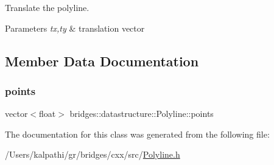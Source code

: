Translate the polyline. 


\begin{DoxyParams}{Parameters}
{\em tx,ty} & translation vector \\
\hline
\end{DoxyParams}


\subsection{Member Data Documentation}
\mbox{\label{classbridges_1_1datastructure_1_1_polyline_a0df21b6c3cc82930a93a495de5affda7}} 
\subsubsection{\texorpdfstring{points}{points}}
{\footnotesize\ttfamily vector$<$float$>$ bridges\+::datastructure\+::\+Polyline\+::points\hspace{0.3cm}{\ttfamily [protected]}}



The documentation for this class was generated from the following file\+:\begin{DoxyCompactItemize}
\item 
/\+Users/kalpathi/gr/bridges/cxx/src/\mbox{\hyperlink{_polyline_8h}{Polyline.\+h}}\end{DoxyCompactItemize}
